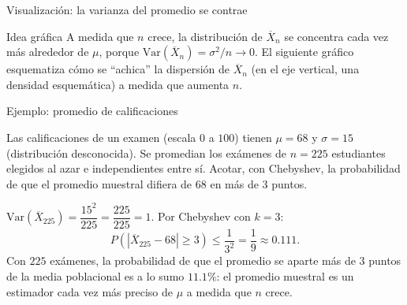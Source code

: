 \documentclass[aspectratio=169,11pt]{beamer}
\begin{document}
\begin{frame}{Visualización: la varianza del promedio se contrae}
\begin{block}{Idea gráfica}
A medida que $n$ crece, la distribución de $\overline{X}_n$ se concentra cada vez más alrededor de $\mu$, porque $\text{Var}(\overline{X}_n) = \sigma^2/n \to 0$. El siguiente gráfico esquematiza cómo se ``achica'' la dispersión de $\overline X_n$ (en el eje vertical, una densidad esquemática) a medida que aumenta $n$.
\end{block}

\begin{center}
\end{center}
\end{frame}

\begin{frame}{Ejemplo: promedio de calificaciones}
\begin{example}
Las calificaciones de un examen (escala $0$ a $100$) tienen $\mu=68$ y $\sigma=15$ (distribución desconocida). Se promedian los exámenes de $n=225$ estudiantes elegidos al azar e independientes entre sí. Acotar, con Chebyshev, la probabilidad de que el promedio muestral difiera de $68$ en más de $3$ puntos.
\end{example}

\medskip
$\text{Var}(\overline X_{225}) = \dfrac{15^2}{225} = \dfrac{225}{225} = 1$. Por Chebyshev con $k=3$:
\[
P(|\overline X_{225}-68|\geq 3) \leq \frac{1}{3^2} = \frac{1}{9} \approx 0.111.
\]
Con $225$ exámenes, la probabilidad de que el promedio se aparte más de $3$ puntos de la media poblacional es a lo sumo $11.1\%$: el promedio muestral es un estimador cada vez más preciso de $\mu$ a medida que $n$ crece.
\end{frame}
\end{document}
